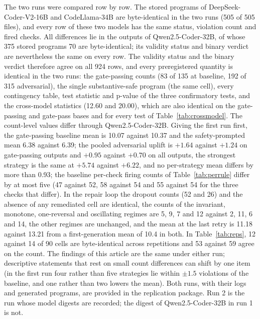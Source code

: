 \documentclass{ieeeaccess}
\begin{document}
The two runs were compared row by row. The stored programs of DeepSeek-Coder-V2-16B and
CodeLlama-34B are byte-identical in the two runs (505 of 505 files), and every row of
these two models has the same status, violation count and fired checks. All differences
lie in the outputs of Qwen2.5-Coder-32B, of whose 375 stored programs 70 are
byte-identical; its validity status and binary verdict are nevertheless the same on every
row. The validity status and the binary verdict therefore agree on all 924 rows, and
every preregistered quantity is identical in the two runs: the gate-passing counts (83 of
135 at baseline, 192 of 315 adversarial), the single substantive-safe program (the same
cell), every contingency table, test statistic and p-value of the three confirmatory
tests, and the cross-model statistics (12.60 and 20.00), which are also identical on the
gate-passing and gate-pass bases and for every test of Table~\ref{tab:crossmodel}. The
count-level values differ
through Qwen2.5-Coder-32B. Giving the first run first, the gate-passing baseline mean is
10.07 against 10.37 and the safety-prompted mean 6.38 against 6.39; the pooled adversarial
uplift is $+1.64$ against $+1.24$ on gate-passing outputs and $+0.95$ against $+0.70$ on
all outputs, the strongest strategy is the same at $+5.74$ against $+6.22$, and no
per-strategy mean differs by more than 0.93; the baseline per-check firing counts of
Table~\ref{tab:perrule} differ by at most five (47 against 52, 58 against 54 and 55
against 54 for the three checks that differ). In the repair loop the dropout counts (52
and 26) and the absence of any remediated cell are identical, the counts of the invariant,
monotone, one-reversal and oscillating regimes are 5, 9, 7 and 12 against 2, 11, 6 and
14, the other regimes are unchanged, and the mean at the last retry is 11.18 against
13.21 from a first-generation mean of 10.4 in both. In Table~\ref{tab:reps}, 12 against
14 of 90 cells are byte-identical across repetitions and 53 against 59 agree on the
count. The findings of this article are the same under either run; descriptive
statements that rest on small count differences can shift by one item (in the first run
four rather than five strategies lie within $\pm 1.5$ violations of the baseline, and one
rather than two lowers the mean). Both runs, with their logs and generated programs, are
provided in the replication package. Run 2 is the run whose model digests are recorded; the digest of Qwen2.5-Coder-32B in run 1 is not.
\end{document}
